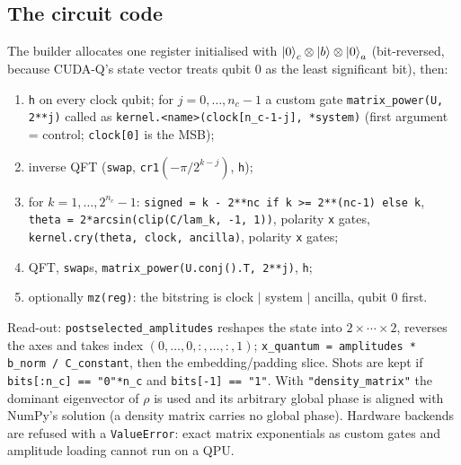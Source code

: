 \documentclass[11pt,a4paper,openany]{book}
\begin{document}
\subsection{The circuit code}
The builder allocates one register initialised with $\ket0_c\otimes\ket b\otimes\ket0_a$ (bit-reversed, because CUDA-Q's state vector treats qubit 0 as the
least significant bit), then:
\begin{enumerate}[itemsep=1pt]
\item \texttt{h} on every clock qubit; for $j = 0, \dots, n_c - 1$ a custom gate \texttt{matrix\_power(U, 2**j)} called as \texttt{kernel.<name>(clock[n\_c-1-j], *system)}
      (first argument = control; \texttt{clock[0]} is the MSB);
\item inverse QFT (\texttt{swap}, \texttt{cr1}$(-\pi/2^{k-j})$, \texttt{h});
\item for $k = 1, \dots, 2^{n_c} - 1$: \texttt{signed = k - 2**nc if k >= 2**(nc-1) else k}, \texttt{theta = 2*arcsin(clip(C/lam\_k, -1, 1))}, polarity \texttt{x} gates,
      \texttt{kernel.cry(theta, clock, ancilla)}, polarity \texttt{x} gates;
\item QFT, \texttt{swap}s, \texttt{matrix\_power(U.conj().T, 2**j)}, \texttt{h};
\item optionally \texttt{mz(reg)}: the bitstring is clock $|$ system $|$ ancilla, qubit 0 first.
\end{enumerate}
Read-out: \texttt{postselected\_amplitudes} reshapes the state into $2\times\cdots\times2$, reverses the axes and takes index $(0,\dots,0, :, \dots, :, 1)$;
\texttt{x\_quantum = amplitudes * b\_norm / C\_constant}, then the embedding/padding slice. Shots are kept if \texttt{bits[:n\_c] == "0"*n\_c} and \texttt{bits[-1] == "1"}.
With \texttt{"density\_matrix"} the dominant eigenvector of $\rho$ is used and its arbitrary global phase is aligned with NumPy's solution (a density matrix carries no global phase).
Hardware backends are refused with a \texttt{ValueError}: exact matrix exponentials as custom gates and amplitude loading cannot run on a QPU.
\end{document}
